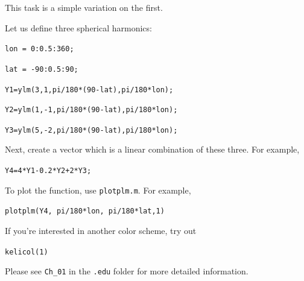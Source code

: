 \documentclass{article}
\begin{document}
\setlength{\parskip}{0.5cm plus4mm minus3mm}

This task is a simple variation on the first. 

Let us define three spherical harmonics:

\verb+lon = 0:0.5:360;+

\verb+lat = -90:0.5:90;+

\verb+Y1=ylm(3,1,pi/180*(90-lat),pi/180*lon);+

\verb+Y2=ylm(1,-1,pi/180*(90-lat),pi/180*lon);+

\verb+Y3=ylm(5,-2,pi/180*(90-lat),pi/180*lon);+

Next, create a vector which is a linear combination of these three. For example,

\verb!Y4=4*Y1-0.2*Y2+2*Y3;!

To plot the function, use \verb+plotplm.m+. For example,

\verb+plotplm(Y4, pi/180*lon, pi/180*lat,1)+

If you're interested in another color scheme, try out 

\verb+kelicol(1)+

Please see \verb+Ch_01+ in the \verb+.edu+ folder for more detailed information.
\end{document}
